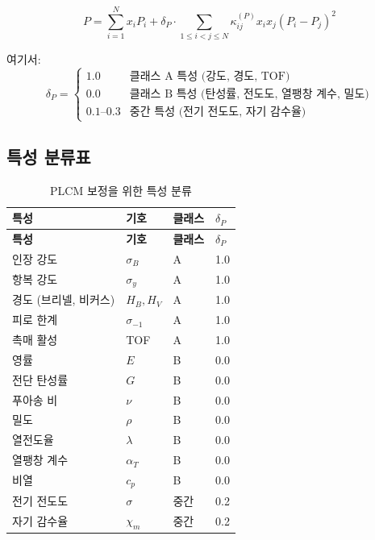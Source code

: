 \documentclass[12pt,a4paper]{article}
\begin{document}
	\begin{equation}
		\boxed{P = \sum_{i=1}^{N} x_i P_i + \delta_P \cdot \sum_{1\le i<j\le N} \kappa_{ij}^{(P)} x_i x_j (P_i - P_j)^2}
		\label{eq:plcm-modified}
	\end{equation}
	
	여기서:
	\[
	\delta_P = \begin{cases}
		1.0 & \text{클래스 A 특성 (강도, 경도, TOF)} \\
		0.0 & \text{클래스 B 특성 (탄성률, 전도도, 열팽창 계수, 밀도)} \\
		0.1\text{--}0.3 & \text{중간 특성 (전기 전도도, 자기 감수율)}
	\end{cases}
	\]
	
	\subsection{특성 분류표}
	
	\begin{longtable}{p{4cm}p{3cm}p{3cm}p{3cm}}
		\caption{PLCM 보정을 위한 특성 분류} \label{tab:property-classification} \\
		\toprule
		\textbf{특성} & \textbf{기호} & \textbf{클래스} & \(\delta_P\) \\
		\midrule
		\endfirsthead
		\toprule
		\textbf{특성} & \textbf{기호} & \textbf{클래스} & \(\delta_P\) \\
		\midrule
		\endhead
		인장 강도 & \(\sigma_B\) & A & 1.0 \\
		항복 강도 & \(\sigma_y\) & A & 1.0 \\
		경도 (브리넬, 비커스) & \(H_B, H_V\) & A & 1.0 \\
		피로 한계 & \(\sigma_{-1}\) & A & 1.0 \\
		촉매 활성 & TOF & A & 1.0 \\
		\hline
		영률 & \(E\) & B & 0.0 \\
		전단 탄성률 & \(G\) & B & 0.0 \\
		푸아송 비 & \(\nu\) & B & 0.0 \\
		밀도 & \(\rho\) & B & 0.0 \\
		열전도율 & \(\lambda\) & B & 0.0 \\
		열팽창 계수 & \(\alpha_T\) & B & 0.0 \\
		비열 & \(c_p\) & B & 0.0 \\
		\hline
		전기 전도도 & \(\sigma\) & 중간 & 0.2 \\
		자기 감수율 & \(\chi_m\) & 중간 & 0.2 \\
		\bottomrule
	\end{longtable}
	
\end{document}
